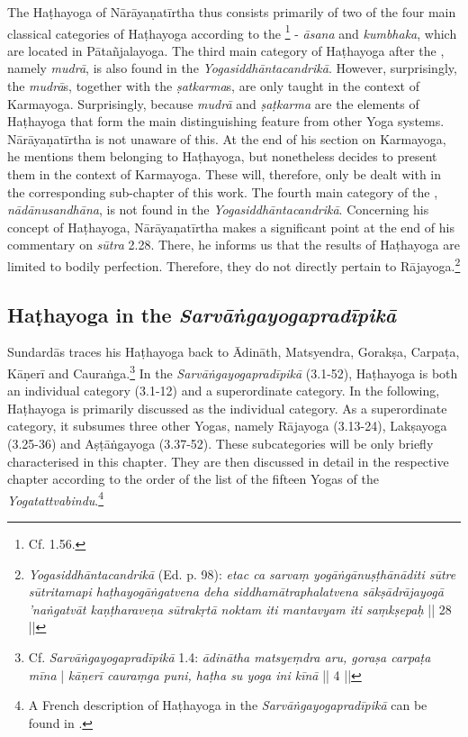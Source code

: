 The Haṭhayoga of Nārāyaṇatīrtha thus consists primarily of two of the four main classical categories of Haṭhayoga according to the \footnote{Cf.  1.56.} - \textit{āsana} and \textit{kumbhaka}, which are located in Pātañjalayoga. The third main category of Haṭhayoga after the , namely \textit{mudrā}, is also found in the \textit{Yogasiddhāntacandrikā}. However, surprisingly, the \textit{mudrā}s, together with the \textit{ṣatkarma}s, are only taught in the context of Karmayoga. Surprisingly, because \textit{mudrā} and \textit{ṣaṭkarma} are the elements of Haṭhayoga that form the main distinguishing feature from other Yoga systems. Nārāyaṇatīrtha is not unaware of this. At the end of his section on Karmayoga, he mentions them belonging to Haṭhayoga, but nonetheless decides to present them in the context of Karmayoga. These will, therefore, only be dealt with in the corresponding sub-chapter of this work. The fourth main category of the , \textit{nādānusandhāna}, is not found in the \textit{Yogasiddhāntacandrikā}. Concerning his concept of Haṭhayoga, Nārāyaṇatīrtha makes a significant point at the end of his commentary on \textit{sūtra} 2.28. There, he informs us that the results of Haṭhayoga are limited to bodily perfection. Therefore, they do not directly pertain to Rājayoga.\footnote{\emph{Yogasiddhāntacandrikā} (Ed. p. 98): \textit{etac ca sarvaṃ yogāṅgānuṣṭhānāditi sūtre sūtritamapi haṭhayogāṅgatvena deha siddhamātraphalatvena sākṣādrājayogā 'naṅgatvāt kaṇṭharaveṇa sūtrakṛtā noktam iti mantavyam iti saṃkṣepaḥ} || 28 ||}

\subsection{Haṭhayoga in the \textit{Sarvāṅgayogapradīpikā}}

Sundardās traces his Haṭhayoga back to Ādināth, Matsyendra, Gorakṣa, Carpaṭa, Kāṇerī and Cauraṅga.\footnote{Cf. \textit{Sarvāṅgayogapradīpikā} 1.4: \textit{ādinātha matsyeṃdra aru, goraṣa carpaṭa mīna} | \textit{kāṇerī cauraṃga puni, haṭha su yoga ini kīnā} || 4 ||} In the \textit{Sarvāṅgayogapradīpikā} (3.1-52), Haṭhayoga is both an individual category (3.1-12) and a superordinate category. In the following, Haṭhayoga is primarily discussed as the individual category. As a superordinate category, it subsumes three other Yogas, namely Rājayoga (3.13-24), Lakṣayoga (3.25-36) and Aṣṭāṅgayoga (3.37-52). These subcategories will be only briefly characterised in this chapter. They are then discussed in detail in the respective chapter according to the order of the list of the fifteen Yogas of the \textit{Yogatattvabindu}.\footnote{A French description of Haṭhayoga in the \textit{Sarvāṅgayogapradīpikā} can be found in \citeauthor[2014: 701-709]{burger2014sarvangayogapradipika}.}

